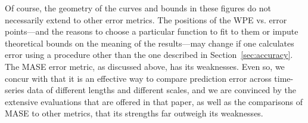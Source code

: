 \documentclass[%
pre,
reprint,
superscriptaddress,
showpacs,
nofootinbib,
nobibnotes,
 amsmath,amssymb,
 aps,
]{revtex4-1}
\begin{document}
Of course, the geometry of the curves and bounds in these figures do
not necessarily extend to other error metrics.  The positions of the
WPE vs. error points---and the reasons to choose a particular function
to fit to them or impute theoretical bounds on the meaning of the
results---may change if one calculates error using a procedure other
than the one described in Section~\ref{sec:accuracy}.  The MASE error
metric, as discussed above, has its weaknesses.  Even so, we concur
with \cite{MASE} that it is an effective way to compare prediction
error across time-series data of different lengths and different
scales, and we are convinced by the extensive evaluations that are
offered in that paper, as well as the comparisons of MASE to other
metrics, that its strengths far outweigh its weaknesses.





\end{document}
